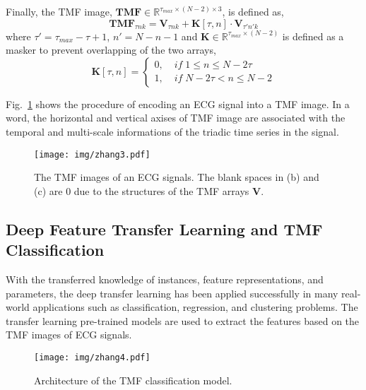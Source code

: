 \documentclass[journal]{IEEEtran}
\begin{document}
Finally, the TMF image, $\mathbold{TMF} \in \mathbb{R}^{\tau_{max} \times (N-2) \times 3}$, is defined as, 
\begin{equation}
  \mathbold{TMF}_{\tau n k} = \mathbold{V}_{\tau n k} + \mathbold{K}[\tau,n] \cdot \mathbold{V}_{\tau' n' k}
\end{equation}
where $\tau'=\tau_{max}-\tau+1$, $n'= N-n-1$ and $\mathbold{K} \in \mathbb{R}^{\tau_{max} \times (N-2)}$ is defined as a masker to prevent overlapping of the two arrays,
\begin{equation}
  \mathbold{K}[\tau,n] = 
  \begin{cases}
    0,  &\; if\; 1 \leq n \leq N-2\tau \\
    1 , &\; if\; N-2\tau < n \leq N-2
  \end{cases}
\end{equation}

Fig.~\ref{fig:TMF} shows the procedure of encoding an ECG signal into a TMF image. In a word, the horizontal and vertical axises of TMF image are associated with the temporal and multi-scale informations of the triadic time series in the signal. 

\begin{figure}[H]
\centering
\texttt{[image: img/zhang3.pdf]}
\caption{The TMF images of an ECG signals. The blank spaces in (b) and (c) are 0 due to the structures of the TMF arrays $\mathbold{V}$. }
\label{fig:TMF}
\end{figure}

\subsection{Deep Feature Transfer Learning and TMF Classification}\label{sec:classify}

With the transferred knowledge of instances, feature representations, and parameters, the deep transfer learning\cite{survey_tranfer_2010,transfer_2014} has been applied successfully in many real-world applications such as classification, regression, and clustering problems. The transfer learning pre-trained models are used to extract the features based on the TMF images of ECG signals. 

\begin{figure}[H]
  \centering
  \texttt{[image: img/zhang4.pdf]}
  \caption{Architecture of the TMF classification model.}
  \label{fig:network}
\end{figure}
\end{document}
